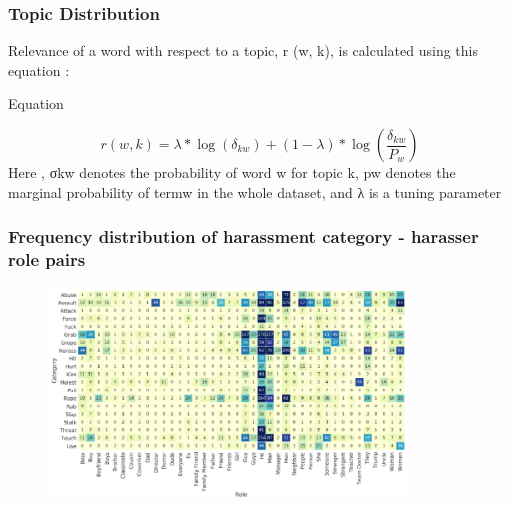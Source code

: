 \documentclass{beamer}
\begin{document}
\begin{frame}
\frametitle{Topic Distribution}
Relevance
of a word with respect to a topic, r (w, k), is calculated using this
equation :


\begin{block}{Equation}

\begin{equation*}
r(w,k) = \lambda * \log(\delta_{kw}) + (1 - \lambda)*\log(\frac{\delta_{kw}}{P_w})
\end{equation*}
Here , σkw denotes the probability of word w for topic k, pw
denotes the marginal probability of termw in the whole dataset, and
λ is a tuning parameter
\end{block}

\end{frame}

\begin{frame}
\frametitle{Frequency distribution of harassment category - harasser role pairs}
\begin{figure}
\centering
\includegraphics[width=0.85\textwidth]{SS5}
\end{figure}

\end{frame}
\end{document}
